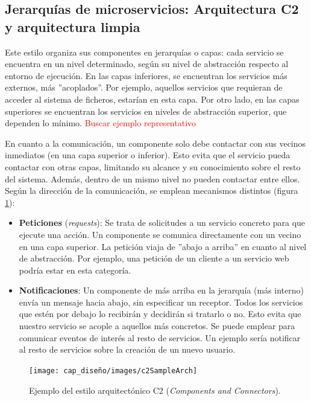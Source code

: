 \subsection{Jerarquías de microservicios: Arquitectura C2 y arquitectura limpia}

Este estilo organiza sus componentes en jerarquías o capas: cada servicio se encuentra en un nivel determinado, según su nivel de abstracción respecto al entorno de ejecución. En las capas inferiores, se encuentran los servicios más externos, más ''acoplados''. Por ejemplo, aquellos servicios que requieran de acceder al sistema de ficheros, estarían en esta capa. Por otro lado, en las capas superiores se encuentran los servicios en niveles de abstracción superior, que dependen lo mínimo. \textcolor{red}{Buscar ejemplo representativo}

En cuanto a la comunicación, un componente solo debe contactar con sus vecinos inmediatos (en una capa superior o inferior). Esto evita que el servicio pueda contactar con otras capas, limitando su alcance y su conocimiento sobre el resto del sistema. Además, dentro de un mismo nivel no pueden contactar entre ellos. Según la dirección de la comunicación, se emplean mecanismos distintos (figura \ref{fig:C2-arch-example}):

\begin{itemize}
  \item \textbf{Peticiones} (\emph{requests}): Se trata de solicitudes a un servicio concreto para que ejecute una acción. Un componente se comunica directamente con un vecino en una capa superior. La petición viaja de ''abajo a arriba'' en cuanto al nivel de abstracción. Por ejemplo, una petición de un cliente a un servicio web podría estar en esta categoría.

  \item \textbf{Notificaciones}: Un componente de más arriba en la jerarquía (más interno) envía un mensaje hacia abajo, sin especificar un receptor. Todos los servicios que estén por debajo lo recibirán y decidirán si tratarlo o no. Esto evita que nuestro servicio se acople a aquellos más concretos. Se puede emplear para comunicar eventos de interés al resto de servicios. Un ejemplo sería notificar al resto de servicios sobre la creación de un nuevo usuario.
\end{itemize}

\begin{figure}[htb]
  \centering
  \texttt{[image: cap\_diseño/images/c2SampleArch]}
  \caption[Ejemplo del estilo arquitectónico C2 (\emph{Components and Connectors})]{Ejemplo del estilo arquitectónico C2 (\emph{Components and Connectors}). \cite{UCISoftwareArchitecture}}
  \label{fig:C2-arch-example}
\end{figure}

